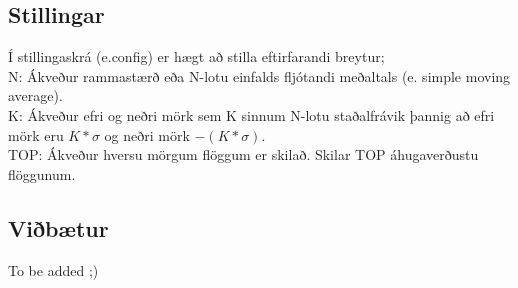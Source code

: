 \documentclass[11pt]{article}
\begin{document}
\subsection{Stillingar}
Í stillingaskrá (e.config) er hægt að stilla eftirfarandi breytur;\\
N: Ákveður rammastærð eða N-lotu einfalds fljótandi meðaltals (e. simple moving average).\\
K: Ákveður efri og neðri mörk sem K sinnum N-lotu staðalfrávik þannig að efri mörk eru $ K*\sigma$ og neðri mörk $-(K*\sigma)$.\\
TOP: Ákveður hversu mörgum flöggum er skilað. Skilar TOP áhugaverðustu flöggunum.
\subsection{Viðbætur}

To be added ;)
\end{document}
